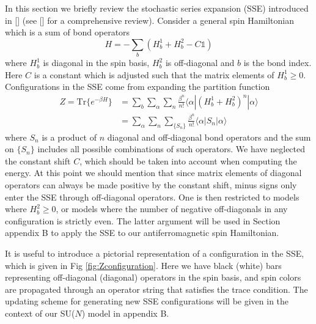 \documentclass[aps,prb,reprint,floatfix]{revtex4-1}
\begin{document}
In this section we briefly review the stochastic series expansion (SSE) introduced in [] (see [] for a comprehensive review).  Consider a general spin Hamiltonian which is a sum of bond operators
{\allowdisplaybreaks
\begin{equation}
		H= -\sum_{b}(H^{1}_{b}+H^{2}_{b}-C \mathds{1})  
\label{eq:SSEHamiltonian}
\end{equation}}
where $H^{1}_{b}$ is diagonal in the spin basis, $H^{2}_{b}$ is off-diagonal and $b$ is the bond index.  Here $C$ is a constant which is adjusted such that the matrix elements of $H^{1}_{b}\geq0$.  Configurations in the SSE come from expanding the partition function
{\allowdisplaybreaks
\begin{equation}
\begin{split}
Z=\text{Tr} \{ e^{-\beta H} \} &=\sum_{b}\sum_{\alpha} \sum_{n}\frac{\beta^{n}}{n!}\langle\alpha|(H^{1}_{b}+H^{2}_{b})^{n}|\alpha\rangle \\
   &=\sum_{\alpha} \sum_{n} \sum_{\{ S_{n} \} }\frac{\beta^{n}}{n!}\langle\alpha|S_{n}|\alpha\rangle
\end{split}
\label{eq:SSEExpansion}
\end{equation}}
where $S_{n}$ is a product of $n$ diagonal and off-diagonal bond operators and the sum on $\{ S_{n} \}$ includes all possible combinations of such operators.  We have neglected the constant shift $C$, which should be taken into account when computing the energy.  At this point we should mention that since matrix elements of diagonal operators can always be made positive by the constant shift, minus signs only enter the SSE through off-diagonal operators.  One is then restricted to models where $H^{2}_{b}\geq0$, or models where the number of negative off-diagonals in any configuration is strictly even.  The latter argument will be used in Section appendix B to apply the SSE to our antiferromagnetic spin Hamiltonian.

It is useful to introduce a pictorial representation of a configuration in the SSE, which is given in  Fig \ref{fig:Zconfiguration}.  Here we have black (white) bars representing off-diagonal (diagonal) operators in the spin basis, and spin colors are propagated through an operator string that satisfies the trace condition.  The updating scheme for generating new SSE configurations will be given in the context of our SU($N$) model in appendix B.    
\end{document}
